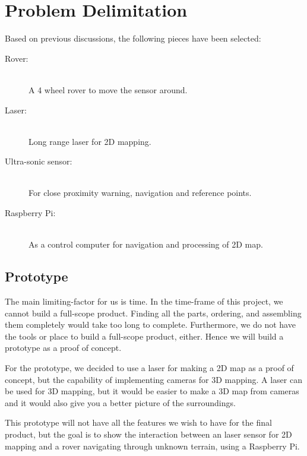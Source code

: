 \section{Problem Delimitation}
Based on previous discussions, the following pieces have been selected:

\begin{description}
  \item[Rover:] \hfill \\
  A 4 wheel rover to move the sensor around.
  \item[Laser:] \hfill \\
  Long range laser for 2D mapping.
  \item[Ultra-sonic sensor:] \hfill \\
  For close proximity warning, navigation and reference points.
  \item[Raspberry Pi:] \hfill \\
  As a control computer for navigation and processing of 2D map.
\end{description}

\subsection{Prototype}
The main limiting-factor for us is time. In the time-frame of this project, we cannot build a full-scope product. Finding all the parts, ordering, and assembling them completely would take too long to complete. Furthermore, we do not have the tools or place to build a full-scope product, either. Hence we will build a prototype as a proof of concept.

For the prototype, we decided to use a laser for making a 2D map as a proof of concept, but the capability of implementing cameras for 3D mapping. A laser can be used for 3D mapping, but it would be easier to make a 3D map from cameras and it would also give you a better picture of the surroundings.

This prototype will not have all the features we wish to have for the final product, but the goal is to show the interaction between an laser sensor for 2D mapping and a rover navigating through unknown terrain, using a Raspberry Pi.

